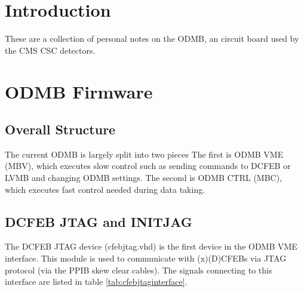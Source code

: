 \documentclass[10pt,a4paper]{article}
\begin{document}

\section{Introduction}

These are a collection of personal notes on the ODMB, an circuit board used by the CMS CSC detectors.

\section{ODMB Firmware}

\subsection{Overall Structure}

The current ODMB is largely split into two pieces The first is ODMB VME (MBV), which executes slow control such as sending commands to DCFEB or LVMB and changing ODMB settings. The second is ODMB CTRL (MBC), which executes fast control needed during data taking.

\subsection{DCFEB JTAG and INITJAG}

The DCFEB JTAG device (cfebjtag.vhd) is the first device in the ODMB VME interface. This module is used to communicate with (x)(D)CFEBs via JTAG protocol (via the PPIB skew clear cables). The signals connecting to this interface are listed in table \ref{tab:cfebjtaginterface}.
\end{document}
